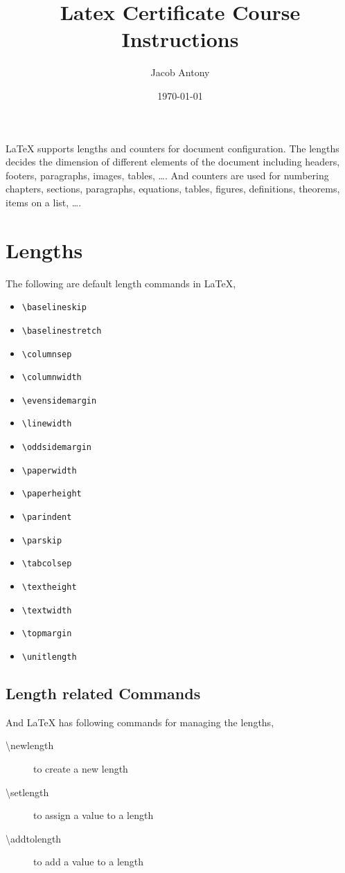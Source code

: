 \documentclass{article}
\title{Latex Certificate Course Instructions}
\author{Jacob Antony}
\date{\today}
\theoremstyle{definition}
\theoremstyle{remark}
\begin{document}
\maketitle
	\LaTeX{} supports lengths and counters for document configuration. The lengths decides the dimension of different elements of the document including headers, footers, paragraphs, images, tables, \dots. And counters are used for numbering chapters, sections, paragraphs, equations, tables, figures, definitions, theorems, items on a list, \dots.

\section{Lengths}
	The following are default length commands in \LaTeX{},
\begin{multicols}{3}
\begin{itemize}
	\item \texttt{\textbackslash baselineskip} 
	\item \texttt{\textbackslash baselinestretch} 
	\item \texttt{\textbackslash columnsep} 
	\item \texttt{\textbackslash columnwidth} 
	\item \texttt{\textbackslash evensidemargin}
	\item \texttt{\textbackslash linewidth}
	\item \texttt{\textbackslash oddsidemargin}
	\item \texttt{\textbackslash paperwidth}
	\item \texttt{\textbackslash paperheight}
	\item \texttt{\textbackslash parindent}
	\item \texttt{\textbackslash parskip}
	\item \texttt{\textbackslash tabcolsep}
	\item \texttt{\textbackslash textheight}
	\item \texttt{\textbackslash textwidth}
	\item \texttt{\textbackslash topmargin}
	\item \texttt{\textbackslash unitlength}
\end{itemize}
\end{multicols}

\subsection{Length related Commands}
	And \LaTeX{} has following commands for managing the lengths,
\begin{description}
	\item[\textbackslash newlength] to create a new length
	\item[\textbackslash setlength] to assign a value to a length
	\item[\textbackslash addtolength] to add a value to a length
\end{description}
\end{document}
